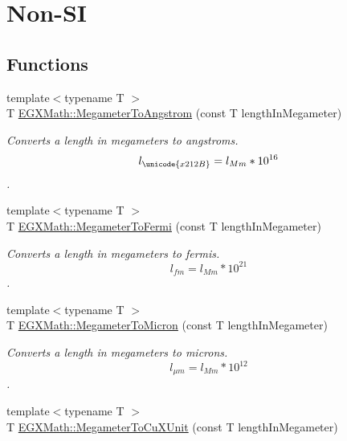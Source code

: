 \hypertarget{group___e_g_x_math-_conversions-_length_conversions-_s_i-_megameter-_non-_s_i}{}\section{Non-\/\+SI}
\label{group___e_g_x_math-_conversions-_length_conversions-_s_i-_megameter-_non-_s_i}
\subsection*{Functions}
\begin{DoxyCompactItemize}
\item 
{\footnotesize template$<$typename T $>$ }\\T \mbox{\hyperlink{group___e_g_x_math-_conversions-_length_conversions-_s_i-_megameter-_non-_s_i_gac4c7e615f4ec3d000ac341a5bf9a79a0}{E\+G\+X\+Math\+::\+Megameter\+To\+Angstrom}} (const T length\+In\+Megameter)
\begin{DoxyCompactList}\small\item\em Converts a length in megameters to angstroms. \[ l_{\unicode{x212B}}=l_{Mm} * 10^{16} \]. \end{DoxyCompactList}\item 
{\footnotesize template$<$typename T $>$ }\\T \mbox{\hyperlink{group___e_g_x_math-_conversions-_length_conversions-_s_i-_megameter-_non-_s_i_ga74f07a7c24ffe784415fb3d33a3b5bec}{E\+G\+X\+Math\+::\+Megameter\+To\+Fermi}} (const T length\+In\+Megameter)
\begin{DoxyCompactList}\small\item\em Converts a length in megameters to fermis. \[ l_{fm}=l_{Mm} * 10^{21} \]. \end{DoxyCompactList}\item 
{\footnotesize template$<$typename T $>$ }\\T \mbox{\hyperlink{group___e_g_x_math-_conversions-_length_conversions-_s_i-_megameter-_non-_s_i_ga14e6b356b28257b1bde9cb9ebf6bc3c6}{E\+G\+X\+Math\+::\+Megameter\+To\+Micron}} (const T length\+In\+Megameter)
\begin{DoxyCompactList}\small\item\em Converts a length in megameters to microns. \[ l_{\mu m}=l_{Mm} * 10^{12} \]. \end{DoxyCompactList}\item 
{\footnotesize template$<$typename T $>$ }\\T \mbox{\hyperlink{group___e_g_x_math-_conversions-_length_conversions-_s_i-_megameter-_non-_s_i_gae44ce2fd3e740a5aec1546ed10c83447}{E\+G\+X\+Math\+::\+Megameter\+To\+Cu\+X\+Unit}} (const T length\+In\+Megameter)

\end{DoxyCompactItemize}
